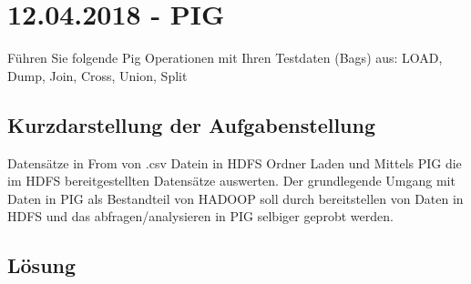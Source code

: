 \section{12.04.2018 - PIG}
Führen Sie folgende Pig Operationen mit Ihren Testdaten (Bags) aus: LOAD,  Dump, Join, Cross, Union, Split

\subsection*{Kurzdarstellung der Aufgabenstellung}
Datensätze in From von .csv Datein in HDFS Ordner Laden und Mittels PIG die im HDFS bereitgestellten Datensätze auswerten. Der grundlegende Umgang mit Daten in PIG als Bestandteil von HADOOP soll durch bereitstellen von Daten in HDFS und das abfragen/analysieren in PIG selbiger geprobt werden.
\subsection*{Lösung}
